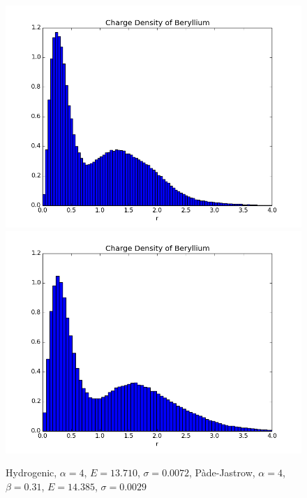 		\begin{figure}
			\centering \includegraphics[width=0.45\linewidth]{../figures/used/ChargeDensityBerylliumSimple}
			\centering \includegraphics[width=0.45\linewidth]{../figures/used/ChargeDensityBeryllium}
			\protect\caption{Hydrogenic, $\alpha = 4$, $E = 13.710$, $\sigma = 0.0072$, Pàde-Jastrow, $\alpha = 4$, $\beta = 0.31$,  $E = 14.385$, $\sigma = 0.0029$}
			\label{fig:charge_density}
		\end{figure}
